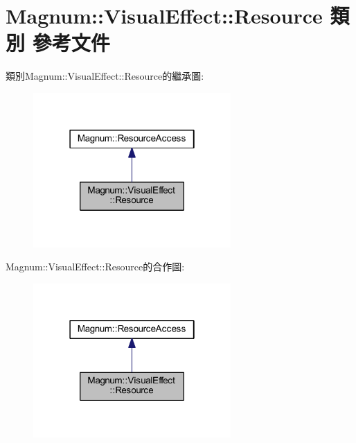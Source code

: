\hypertarget{class_magnum_1_1_visual_effect_1_1_resource}{}\section{Magnum\+:\+:Visual\+Effect\+:\+:Resource 類別 參考文件}
\label{class_magnum_1_1_visual_effect_1_1_resource}


類別\+Magnum\+:\+:Visual\+Effect\+:\+:Resource的繼承圖\+:\nopagebreak
\begin{figure}[H]
\begin{center}
\leavevmode
\includegraphics[width=214pt]{class_magnum_1_1_visual_effect_1_1_resource__inherit__graph}
\end{center}
\end{figure}


Magnum\+:\+:Visual\+Effect\+:\+:Resource的合作圖\+:\nopagebreak
\begin{figure}[H]
\begin{center}
\leavevmode
\includegraphics[width=214pt]{class_magnum_1_1_visual_effect_1_1_resource__coll__graph}
\end{center}
\end{figure}
